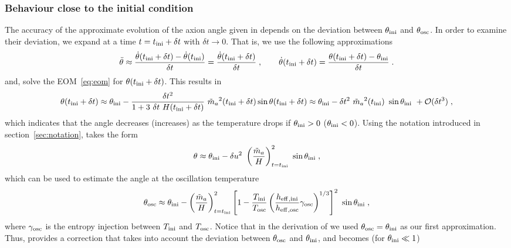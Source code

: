 \documentclass[11pt,a4paper]{article}
\begin{document}
\subsubsection{Behaviour close to the initial condition}\label{sec:close_to_ini}
%
%
The accuracy of the approximate evolution of the axion angle given in  depends on the deviation between $\theta_{\rm ini}{}$ and $\theta_{\rm osc}{}$. In order to examine their deviation, we expand  at a time $t =t_{\rm ini}{} + \delta t$ with $\delta t \to 0$. That is, we use the following approximations 
%
\begin{equation*}
	\ddot{\theta} \approx \dfrac{\dot \theta (t_{\rm ini}{}+ \delta t)  - \dot \theta (t_{\rm ini}{})}{ \delta  t } =  \dfrac{\dot \theta (t_{\rm ini}{} + \delta t)  }{\delta  t } \;,
	\qquad
	\dot \theta(t_{\rm ini}{} + \delta t) = \dfrac{\theta(t_{\rm ini}{} + \delta t) - \theta_{\rm ini}{}}{\delta t} \;.
\end{equation*} 
%
and, solve the EOM~\ref{eq:eom} for $\theta(t_{\rm ini}{} + \delta t)$. This results in
%
\begin{equation}
	\theta(t_{\rm ini}{} + \delta t)  \approx  \theta_{\rm ini}{} -\dfrac{\delta t^2}{1+3\ \delta t \ H(t_{\rm ini}{} + \delta t) } \  \tilde m_{a}{}^2(t_{\rm ini}{} + \delta t)  \sin \theta(t_{\rm ini}{} + \delta t)  
	\approx   \theta_{\rm ini}{} - \delta t^2 \ \tilde m_{a}{}^2(t_{\rm ini}{}) \ \sin \theta_{\rm ini}{}  \ + \mathcal{O}(\delta t^3)\;, 
	\label{eq:theta_dt}
\end{equation}
%
which indicates that the angle decreases (increases) as the temperature drops if $\theta_{\rm ini}{}>0$ ($\theta_{\rm ini}{}<0$). Using the notation introduced in section~\ref{sec:notation},  takes the form
%
\begin{eqnarray}
	\theta \approx    \thetai - \delta u^2 \ \lrb{\dfrac{\maT}{H}}_{t=\ti}^2 \ \sin \thetai \;,
	\label{eq:theta_du}
\end{eqnarray}
%
which can be used to estimate the angle at the oscillation temperature
%
\begin{eqnarray}
	\theta_{\rm osc}{} \approx    \theta_{\rm ini}{} -  \left( \dfrac{\tilde m_{a}{}}{H} \right)_{t=t_{\rm ini}{}}^2 
	\left[ 1- \dfrac{T_{\rm ini}{}}{T_{\rm osc}{}}\left( \dfrac{h_{\rm eff}{}_{,\rm ini}}{h_{\rm eff}{}_{,\rm osc}}\gamma_{\rm osc} \right)^{1/3} \right]^{2}   \ \sin \theta_{\rm ini}{} \;,
	\label{eq:theta_osc}
\end{eqnarray}
%
where  $\gamma_{\rm osc}$ is the entropy injection between $T_{\rm ini}{}$ and $T_{\rm osc}{}$. Notice that in the derivation of  we used $\theta_{\rm osc} = \theta_{\rm ini}{}$ as our first approximation. Thus,  provides a correction that takes into account the deviation between $\theta_{\rm osc} $ and $ \theta_{\rm ini}{}$, and  becomes (for $\theta_{\rm ini}{} \ll 1$)
\end{document}
